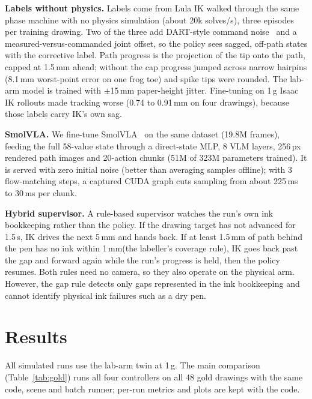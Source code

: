 \documentclass[conference]{IEEEtran}
\newcommand{\mm}{\,mm\xspace}
\begin{document}
\textbf{Labels without physics.} Labels come from Lula IK walked through the same phase machine with no
physics simulation (about 20k solves/s), three episodes per training drawing. Two of the three add DART-style
command noise~\cite{laskey2017dart} and a measured-versus-commanded joint offset, so the policy sees sagged,
off-path states with the corrective label. Path progress is the projection of the tip onto the path, capped
at 1.5\mm ahead; without the cap progress jumped across narrow hairpins (8.1\mm worst-point error on one
frog toe) and spike tips were rounded. The lab-arm model is trained with $\pm$15\mm paper-height jitter.
Fine-tuning on 1\,g Isaac IK rollouts made tracking worse (0.74 to 0.91\mm on four drawings), because those
labels carry IK's own sag.

\textbf{SmolVLA.} We fine-tune SmolVLA~\cite{shukor2025smolvla} on the same dataset (19.8M frames), feeding the
full 58-value state through a direct-state MLP, 8 VLM layers, 256\,px rendered path images and 20-action chunks
(51M of 323M parameters trained). It is served with zero initial noise (better than averaging samples
offline); with 3 flow-matching steps, a captured CUDA graph cuts sampling from about 225\,ms to 30\,ms per
chunk.

\textbf{Hybrid supervisor.} A rule-based supervisor watches
the run's own ink bookkeeping rather than the policy. If the drawing target has not advanced for 1.5\,s, IK drives
the next 5\mm and hands back. If at least 1.5\mm of path behind the pen has no ink within 1\mm (the labeller's
coverage rule), IK goes back past the gap and forward again while the run's progress is held, then the policy
resumes. Both rules need no camera, so they also operate on the physical arm. However, the gap rule detects only gaps
represented in the ink bookkeeping and cannot identify physical ink failures such as a dry pen.

\section{Results}
\label{sec:results}

All simulated runs use the lab-arm twin at 1\,g. The main comparison (Table~\ref{tab:gold})
runs all four controllers on all 48 gold drawings with the same code, scene and batch runner; per-run metrics and
plots are kept with the code.
\end{document}
